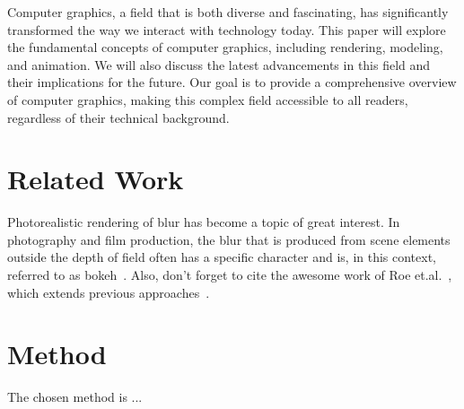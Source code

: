 Computer graphics, a field that is both diverse and fascinating, has significantly transformed the way we interact with technology today. This paper will explore the fundamental concepts of computer graphics, including rendering, modeling, and animation. We will also discuss the latest advancements in this field and their implications for the future.
Our goal is to provide a comprehensive overview of computer graphics, making this complex field accessible to all readers, regardless of their technical background.

\section{Related Work}
Photorealistic rendering of blur has become a topic of great interest. In photography and film production, the blur that is produced from scene elements outside the depth of field often has a specific character and is, in this context, referred to as bokeh~\cite{luo2020bokeh}. Also, don't forget to cite the awesome work of Roe et.al.~\cite{roe17}, which extends previous approaches~\cite{everyman14,smith14}.


\section{Method}
The chosen method is ...









